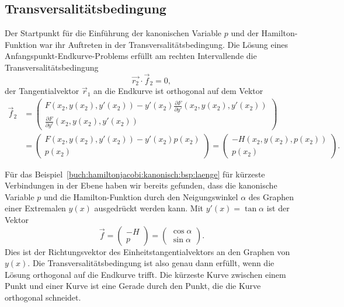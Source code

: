 \subsection{Transversalitätsbedingung}
Der Startpunkt für die Einführung der kanonischen Variable $p$ und
der Hamilton-Funktion war ihr Auftreten in der Transversalitätsbedingung.
Die Lösung eines Anfangspunkt-End\-kur\-ve-Problems erfüllt am rechten 
Intervallende die Transversalitätsbedingung
\[
\vec{r_2}\cdot \vec{f}_2=0,
\]
der Tangentialvektor $\vec{r}_1$ an die Endkurve ist orthogonal auf
dem Vektor
\begin{align*}
\vec{f}_2
&=
\begin{pmatrix}
\displaystyle
F(x_2,y(x_2),y'(x_2))-y'(x_2)\frac{\partial F}{\partial y'}(x_2,y(x_2),y'(x_2))
\\[5pt]
\displaystyle
\frac{\partial F}{\partial y'}(x_2,y(x_2),y'(x_2))
\end{pmatrix}
\\
&=
\begin{pmatrix}
F(x_2,y(x_2),y'(x_2)) - y'(x_2) p(x_2) \\
p(x_2)
\end{pmatrix}
=
\begin{pmatrix}
-H(x_2,y(x_2),p(x_2))\\
p(x_2)
\end{pmatrix}.
\end{align*}

\begin{beispiel}
Für das Beispiel~\ref{buch:hamiltonjacobi:kanonisch:bsp:laenge}
für kürzeste Verbindungen in der Ebene haben wir bereits gefunden,
dass die kanonische Variable $p$ und die Hamilton-Funktion durch 
den Neigungswinkel $\alpha$ des Graphen einer Extremalen $y(x)$
ausgedrückt werden kann.
Mit $y'(x)=\tan\alpha$ ist der Vektor
\[
\vec{f}
=
\begin{pmatrix}
-H\\
p
\end{pmatrix}
=
\begin{pmatrix}
\cos\alpha\\
\sin\alpha
\end{pmatrix}.
\]
Dies ist der Richtungsvektor des Einheitstangentialvektors an
den Graphen von $y(x)$.
Die Transversalitätsbedingung ist also genau dann erfüllt, wenn die
Lösung orthogonal auf die Endkurve trifft.
Die kürzeste Kurve zwischen einem Punkt und einer Kurve ist eine
Gerade durch den Punkt, die die Kurve orthogonal schneidet.
\end{beispiel}

